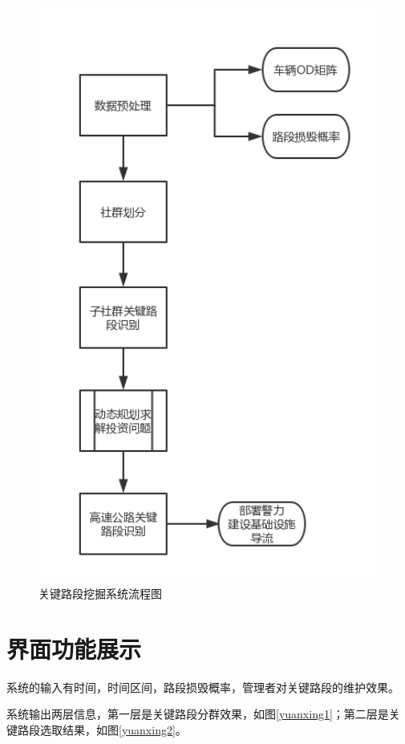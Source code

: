 		\begin{figure}[h]
		\centering
				\begin{minipage}{0.8\linewidth}
					\centering
					\includegraphics[width=4.4in]{picture/liuchengtu}
					\caption{关键路段挖掘系统流程图}
					\label{fig21}
				\end{minipage}%
		\end{figure}
		
	\section{界面功能展示}

		系统的输入有时间，时间区间，路段损毁概率，管理者对关键路段的维护效果。

		系统输出两层信息，第一层是关键路段分群效果，如图\ref{yuanxing1}；第二层是关键路段选取结果，如图\ref{yuanxing2}。

